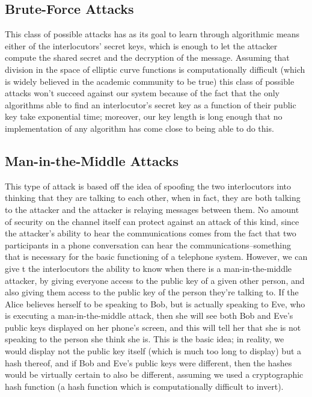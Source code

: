 \documentclass[a4paper]{report}
\begin{document}
\subsection{Brute-Force Attacks} 

This class of possible attacks has as its goal to learn through algorithmic means either of the interlocutors' secret keys, which is enough to let the attacker compute the shared secret and the decryption of the message. Assuming that division in the space of elliptic curve functions is computationally difficult (which is widely believed in the academic community to be true) this class of possible attacks won't succeed against our system because of the fact that the only algorithms able to find an interlocutor's secret key as a function of their public key take exponential time; moreover, our key length is long enough that no implementation of any algorithm has come close to being able to do this.

\subsection{Man-in-the-Middle Attacks}

This type of attack is based off the idea of spoofing the two interlocutors into thinking that they are talking to each other, when in fact, they are both talking to the attacker and the attacker is relaying messages between them. No amount of security on the channel itself can protect against an attack of this kind, since the attacker's ability to hear the communications comes from the fact that two participants in a phone conversation can hear the communications--something that is necessary for the basic functioning of a telephone system. However, we can give t the interlocutors the ability to know when there is a man-in-the-middle attacker, by giving everyone access to the public key of a given other person, and also giving them access to the public key of the person they're talking to. If the Alice believes herself to be speaking to Bob, but is actually speaking to Eve, who is executing a man-in-the-middle attack, then she will %
see both Bob and Eve's public keys displayed on her phone's screen, and this will %
tell her that she is not speaking to the person she think she is. This is the basic idea; in reality, we would display not the public key itself (which is much too long to display) but a hash thereof, and if Bob and Eve's public keys were different, then the hashes would be virtually certain to also be different, assuming we used a cryptographic hash function (a hash function which is computationally difficult to invert).
\end{document}
